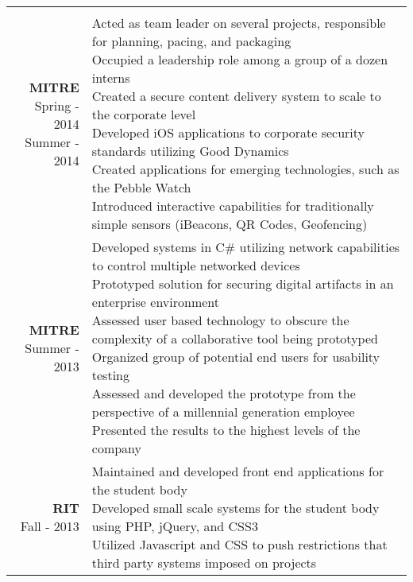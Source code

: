 \documentclass{article}
\makeatletter
\newcommand*\lineBr[2][c]{\begin{tabular}[#1]{@{}r@{}}#2\end{tabular}}
\newcommand*\lineBl[2][c]{\begin{tabular}[#1]{@{}l@{}}#2\end{tabular}}
\makeatother
\begin{document}
\begin{tabularx}{\textwidth}{ r | X }
{  } \\
  \vspace{4mm}
  \lineBr{ {\large {\bf MITRE }\\[2mm]Spring - 2014\\Summer - 2014}} &
  \lineBl{
    Acted as team leader on several projects, responsible for planning, pacing, and packaging \\[2mm]
    Occupied a leadership role among a group of a dozen interns \\[2mm]
    Created a secure content delivery system to scale to the corporate level \\[2mm]
    Developed iOS applications to corporate security standards utilizing Good Dynamics \\[2mm]
    Created applications for emerging technologies, such as the Pebble Watch \\[2mm]
    Introduced interactive capabilities for traditionally simple sensors (iBeacons, QR Codes, Geofencing) \\[2mm]
  } \\
  \vspace{4mm}
  \lineBr{ {\large {\bf MITRE }\\[2mm]Summer - 2013}} &
  \lineBl{
    Developed systems in C\# utilizing network capabilities to control multiple networked devices \\[2mm]
    Prototyped solution for securing digital artifacts in an enterprise environment\\[2mm]
    Assessed user based technology to obscure the complexity of a collaborative tool being prototyped \\[2mm]
    Organized group of potential end users for usability testing \\[2mm]
    Assessed and developed the prototype from the perspective of a millennial generation employee \\[2mm]
    Presented the results to the highest levels of the company 
  } \\
  \vspace{4mm}
  \lineBr{ {\large {\bf RIT }\\[2mm]Fall - 2013}} &
  \lineBl{
    Maintained and developed front end applications for the student body \\[2mm]
    Developed small scale systems for the student body using PHP, jQuery, and CSS3 \\[2mm]
    Utilized Javascript and CSS to push restrictions that third party systems imposed on projects 
  }
\end{tabularx}
\end{document}
